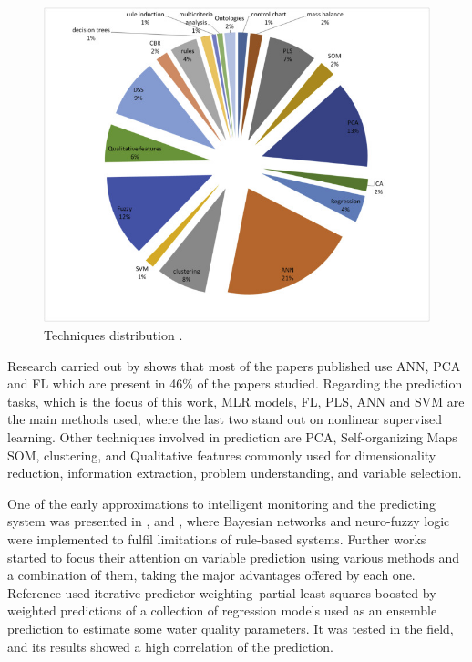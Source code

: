 \begin{figure}[t]
\centering
\includegraphics[width=15cm]{figures/3-Distribution-of-papers.jpg}
\caption{Techniques distribution \cite{Corominas2018}.}
\label{f:Techniques-Distribution}
\end{figure}

Research carried out by \cite{Corominas2018} shows that most of the papers published use \ac{ANN}, \ac{PCA} and \ac{FL} which are present in 46\% of the papers studied. Regarding the prediction tasks, which is the focus of this work, \ac{MLR} models, \ac{FL}, \ac{PLS}, \ac{ANN} and \ac{SVM} are the main methods used, where the last two stand out on nonlinear supervised learning. Other techniques involved in prediction are \ac{PCA}, Self-organizing Maps \ac{SOM}, clustering, and Qualitative features commonly used for dimensionality reduction, information extraction, problem understanding, and variable selection.

One of the early approximations to intelligent monitoring and the predicting system was presented in \cite{Sanguesa2000}, and \cite{Haggege2005}, where Bayesian networks and neuro-fuzzy logic were implemented to fulfil limitations of rule-based systems. Further works started to focus their attention on variable prediction using various methods and a combination of them, taking the major advantages offered by each one. Reference \cite{Qin2012} used iterative predictor weighting–partial least squares boosted by weighted predictions of a collection of regression models used as an ensemble prediction to estimate some water quality parameters. It was tested in the field, and its results showed a high correlation of the prediction. 

